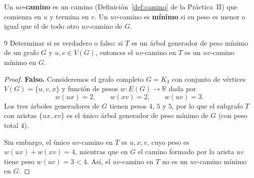 \begin{definition}
    Un \textbf{\( uv \)-camino} es un camino (Definición~\ref{def:camino} de la Práctica~II) que comienza en \( u \) y termina en \( v \). Un \( uv \)-camino es \textbf{mínimo} si su peso es menor o igual que el de todo otro \( uv \)-camino de \( G \).
\end{definition}

\begin{ejercicioEntregar}{9}
    Determinar si es verdadero o falso: si \( T \) es un árbol generador de peso mínimo de un grafo \( G \) y \( u, v \in V(G) \), entonces el \( uv \)-camino en \( T \) es un \( uv \)-camino mínimo en \( G \).
\end{ejercicioEntregar}
\begin{proof}
    \textbf{Falso.} Consideremos el grafo completo \( G = K_3 \) con conjunto de vértices \( V(G) = \{u, v, x\} \) y función de pesos \( w : E(G) \to \mathbb{R} \) dada por
    \[
        w(ux) = 2, \qquad w(xv) = 2, \qquad w(uv) = 3.
    \]
    Los tres árboles generadores de \( G \) tienen pesos \( 4 \), \( 5 \) y \( 5 \), por lo que el subgrafo \( T \) con aristas \( \{ux, xv\} \) es el único árbol generador de peso mínimo de \( G \) (con peso total \( 4 \)).

    Sin embargo, el único \( uv \)-camino en \( T \) es \( u, x, v \), cuyo peso es \( w(ux) + w(xv) = 4 \), mientras que en \( G \) el camino formado por la arista \( uv \) tiene peso \( w(uv) = 3 < 4 \). Así, el \( uv \)-camino en \( T \) no es un \( uv \)-camino mínimo en \( G \).
\end{proof}

\vspace{0.5cm}

